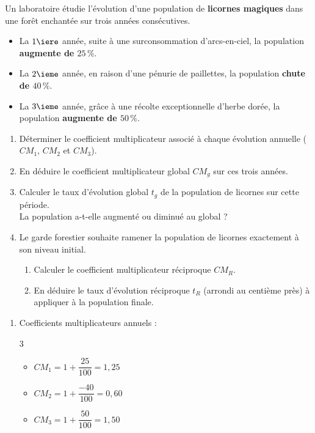 \begin{exercice}
	Un laboratoire étudie l'évolution d'une population de \textbf{licornes magiques} dans une forêt enchantée sur trois années consécutives.

	\begin{itemize}
		\item La $1\iere$ année, suite à une surconsommation d'arcs-en-ciel, la population \textbf{augmente de $25\,\%$}.
		\item La $2\ieme$ année, en raison d'une pénurie de paillettes, la population \textbf{chute de $40\,\%$}.
		\item La $3\ieme$ année, grâce à une récolte exceptionnelle d'herbe dorée, la population \textbf{augmente de $50\,\%$}.
	\end{itemize}

	\begin{enumerate}
		\item Déterminer le coefficient multiplicateur associé à chaque évolution annuelle ($CM_1$, $CM_2$ et $CM_3$).
		\item En déduire le coefficient multiplicateur global $CM_g$ sur ces trois années.
		\item Calculer le taux d'évolution global $t_g$ de la population de licornes sur cette période.\\
		      La population a-t-elle augmenté ou diminué au global ?
		\item Le garde forestier souhaite ramener la population de licornes exactement à son niveau initial.
		      \begin{enumerate}
			      \item Calculer le coefficient multiplicateur réciproque $CM_R$.
			      \item En déduire le taux d'évolution réciproque $t_R$ (arrondi au centième près) à appliquer à la population finale.
		      \end{enumerate}
	\end{enumerate}

	\begin{correction}
		\nline
		\begin{enumerate}
			\item {Coefficients multiplicateurs annuels :}
			      \begin{multicols}{3}
				      \begin{itemize}
					      \item $CM_1 = 1 + \dfrac{25}{100} = 1{,}25$
					      \item $CM_2 = 1 + \dfrac{-40}{100} = 0{,}60$
					      \item $CM_3 = 1 + \dfrac{50}{100} = 1{,}50$
				      \end{itemize}
			      \end{multicols}


\end{enumerate}
\end{correction}
\end{exercice}
